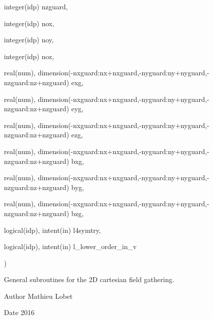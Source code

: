{\begin{DoxyParamCaption}
\item[{integer(idp)}]{nzguard, }
\item[{integer(idp)}]{nox, }
\item[{integer(idp)}]{noy, }
\item[{integer(idp)}]{noz, }
\item[{real(num), dimension(-\/nxguard\+:nx+nxguard,-\/nyguard\+:ny+nyguard,-\/nzguard\+:nz+nzguard)}]{exg, }
\item[{real(num), dimension(-\/nxguard\+:nx+nxguard,-\/nyguard\+:ny+nyguard,-\/nzguard\+:nz+nzguard)}]{eyg, }
\item[{real(num), dimension(-\/nxguard\+:nx+nxguard,-\/nyguard\+:ny+nyguard,-\/nzguard\+:nz+nzguard)}]{ezg, }
\item[{real(num), dimension(-\/nxguard\+:nx+nxguard,-\/nyguard\+:ny+nyguard,-\/nzguard\+:nz+nzguard)}]{bxg, }
\item[{real(num), dimension(-\/nxguard\+:nx+nxguard,-\/nyguard\+:ny+nyguard,-\/nzguard\+:nz+nzguard)}]{byg, }
\item[{real(num), dimension(-\/nxguard\+:nx+nxguard,-\/nyguard\+:ny+nyguard,-\/nzguard\+:nz+nzguard)}]{bzg, }
\item[{logical(idp), intent(in)}]{l4symtry, }
\item[{logical(idp), intent(in)}]{l\+\_\+lower\+\_\+order\+\_\+in\+\_\+v}
\end{DoxyParamCaption}
)}\hypertarget{field__gathering__2d_8_f90_a6d4781dd6cacd0867443a1d9ff142ad7}{}\label{field__gathering__2d_8_f90_a6d4781dd6cacd0867443a1d9ff142ad7}


General subroutines for the 2D cartesian field gathering. 

\begin{DoxyAuthor}{Author}
Mathieu Lobet 
\end{DoxyAuthor}
\begin{DoxyDate}{Date}
2016 
\end{DoxyDate}
